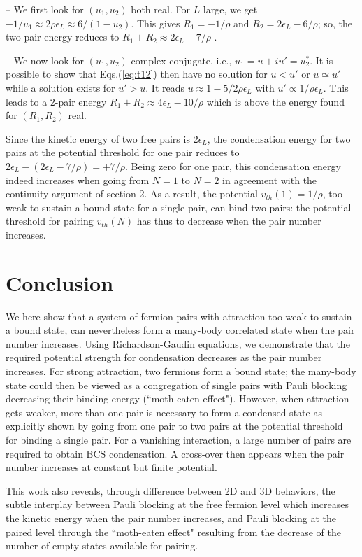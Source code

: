 \documentclass[5p,twocolumn]{elsarticle}
\begin{document}
-- We first look for $(u_1,u_2)$ both real. For $L$ large, we get $-1/u_1\approx 2 \rho\epsilon_L \approx 6/(1-u_2)$. This gives $R_1=-1/\rho$ and $R_2=2 \epsilon_L-6/\rho$; so, the two-pair energy reduces to $R_1+R_2\approx2 \epsilon_L-7/\rho$ .

--  We now look for $(u_1,u_2)$ complex conjugate, i.e., $u_1=u+iu'=u^*_2$. It is possible to show that Eqs.(\ref{eq:t12}) then have no solution for $u<u'$ or $u\simeq u'$ while a solution exists for $u'>u$. It reads $u\approx1-5/2\rho\epsilon_L$ with $u'\propto1/\rho\epsilon_L$. This leads to a 2-pair energy $R_1+R_2\approx4 \epsilon_L-10/\rho$ which is above the energy found for $(R_1,R_2)$ real.

Since the kinetic energy of two free pairs is $2\epsilon_L$, the condensation energy for two pairs at the potential threshold for one pair reduces to 
$ 2\epsilon_L-(2 \epsilon_L-7/\rho)=+7/\rho$. Being zero for one pair, this condensation energy indeed increases when going from $N=1$ to $N=2$ in agreement with the continuity argument of section 2. As a result, the potential $v_{th}(1)=1/\rho$, too weak to sustain a bound state for a single pair, can bind two pairs: the potential threshold for pairing $v_{th}(N)$ has thus to decrease when the pair number increases.

 

\section{Conclusion\label{sec:conclusion}}
We here show that a system of fermion pairs with attraction too weak to sustain a bound state, can nevertheless form a many-body correlated state when the pair number increases.  Using Richardson-Gaudin equations, we demonstrate that the required potential strength for condensation decreases as the pair number increases.  For strong attraction, two fermions form a bound state; the many-body state could then be viewed as a congregation of single pairs with Pauli blocking decreasing their binding energy (``moth-eaten effect").  However, when attraction gets weaker, more than one pair is necessary to form a condensed state as explicitly shown by going from one pair to two pairs at the potential threshold for binding a single pair.  For a vanishing interaction, a large number of pairs are required to obtain BCS condensation.   A cross-over then appears when the pair number increases at constant but finite potential.

 This work also reveals, through difference between 2D and 3D behaviors, the subtle interplay between Pauli blocking at the free fermion level which increases the kinetic energy when the pair number increases, and Pauli blocking at the paired level through the ``moth-eaten effect" resulting from the decrease of the number of empty states available for pairing.
\end{document}
